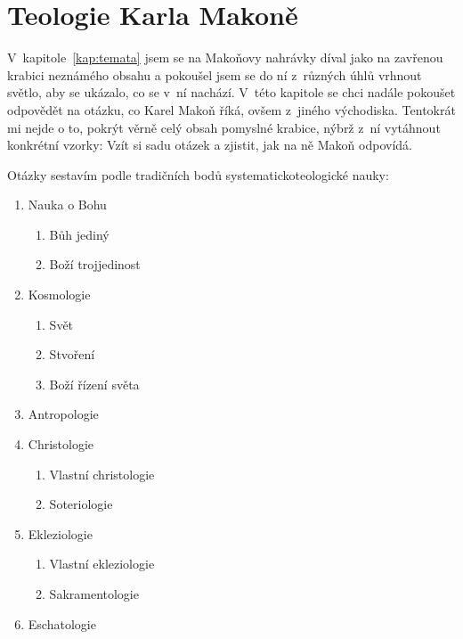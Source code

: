 \chapter{Teologie Karla Makoně}
\label{kap:teologie}

V~kapitole~\ref{kap:temata} jsem se na Makoňovy nahrávky díval jako na zavřenou
krabici neznámého obsahu a pokoušel jsem se do ní z~různých úhlů vrhnout světlo,
aby se ukázalo, co se v~ní nachází. V~této kapitole se chci nadále pokoušet
odpovědět na otázku, co Karel Makoň říká, ovšem z~jiného východiska. Tentokrát
mi nejde o to, pokrýt věrně celý obsah pomyslné krabice, nýbrž z~ní vytáhnout
konkrétní vzorky: Vzít si sadu otázek a zjistit, jak na ně Makoň odpovídá.

Otázky sestavím podle tradičních bodů systematicko\-teologické nauky:
\begin{enumerate}
    \item{%
        Nauka o Bohu
        \begin{enumerate}
            \item{Bůh jediný}
            \item{Boží trojjedinost}
        \end{enumerate}
    }
    \item{%
        Kosmologie
        \begin{enumerate}
            \item{Svět}
            \item{Stvoření}
            \item{Boží řízení světa}
        \end{enumerate}
    }
    \item{Antropologie}
    \item{%
        Christologie
        \begin{enumerate}
            \item{Vlastní christologie}
            \item{Soteriologie}
        \end{enumerate}
    }
    \item{%
        Ekleziologie
        \begin{enumerate}
            \item{Vlastní ekleziologie}
            \item{Sakramentologie}
        \end{enumerate}
    }
    \item{Eschatologie}
\end{enumerate}

